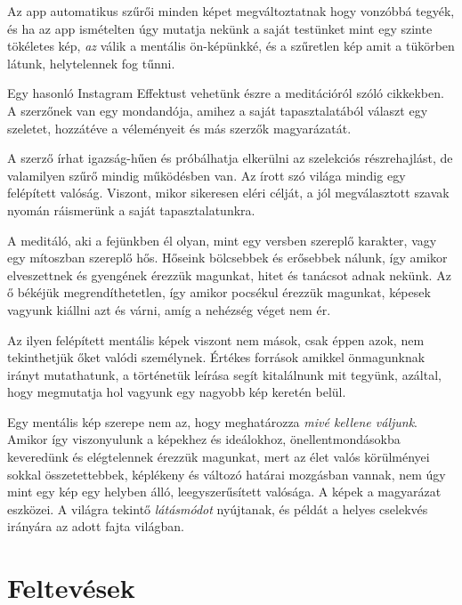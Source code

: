Az app automatikus szűrői minden képet megváltoztatnak hogy vonzóbbá
tegyék, és ha az app ismételten úgy mutatja nekünk a saját testünket
mint egy szinte tökéletes kép, \emph{az} válik a mentális ön-képünkké,
és a szűretlen kép amit a tükörben látunk, helytelennek fog tűnni.

Egy hasonló Instagram Effektust vehetünk észre a meditációról szóló
cikkekben. A szerzőnek van egy mondandója, amihez a saját
tapasztalatából választ egy szeletet, hozzátéve a véleményeit és más
szerzők magyarázatát.

\enlargethispage*{\baselineskip}

A szerző írhat igazság-hűen és próbálhatja elkerülni az szelekciós
részrehajlást, de valamilyen szűrő mindig működésben van. Az írott szó
világa mindig egy felépített valóság. Viszont, mikor sikeresen eléri
célját, a jól megválasztott szavak nyomán ráismerünk a saját
tapasztalatunkra.

\clearpage


A meditáló, aki a fejünkben él olyan, mint egy versben szereplő
karakter, vagy egy mítoszban szereplő hős. Hőseink bölcsebbek és
erősebbek nálunk, így amikor elveszettnek és gyengének érezzük magunkat,
hitet és tanácsot adnak nekünk. Az ő békéjük megrendíthetetlen, így
amikor pocsékul érezzük magunkat, képesek vagyunk kiállni azt és várni,
amíg a nehézség véget nem ér.

Az ilyen felépített mentális képek viszont nem mások, csak éppen azok,
nem tekinthetjük őket valódi személynek. Értékes források amikkel
önmagunknak irányt mutathatunk, a történetük leírása segít kitalálnunk
mit tegyünk, azáltal, hogy megmutatja hol vagyunk egy nagyobb kép
keretén belül.

Egy mentális kép szerepe nem az, hogy meghatározza \emph{mivé kellene
váljunk}. Amikor így viszonyulunk a képekhez és ideálokhoz,
önellentmondásokba keveredünk és elégtelennek érezzük magunkat, mert az
élet valós körülményei sokkal összetettebbek, képlékeny és változó
határai mozgásban vannak, nem úgy mint egy kép egy helyben álló,
leegyszerűsített valósága. A képek a magyarázat eszközei. A világra
tekintő \emph{látásmódot} nyújtanak, és példát a helyes cselekvés
irányára az adott fajta világban.

\clearpage

\section{Feltevések}

